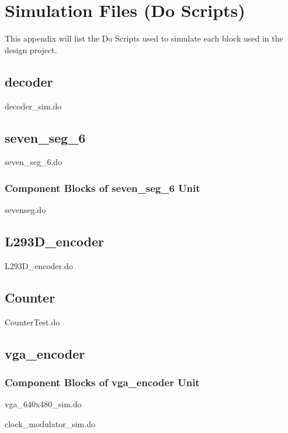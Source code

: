 \documentclass[a4paper]{article}
\begin{document}
\clearpage




\section{Simulation Files (Do Scripts)}
This appendix will list the Do Scripts used to simulate each block used in the design project.

\subsection{decoder}
decoder\_sim.do


\subsection{seven\_seg\_6}
seven\_seg\_6.do


\subsubsection{Component Blocks of seven\_seg\_6 Unit}
sevenseg.do


\clearpage

\subsection{L293D\_encoder}
L293D\_encoder.do


\subsection{Counter}
CounterTest.do


\subsection{vga\_encoder}
\subsubsection{Component Blocks of vga\_encoder Unit}
vga\_640x480\_sim.do


clock\_modulator\_sim.do

\end{document}
